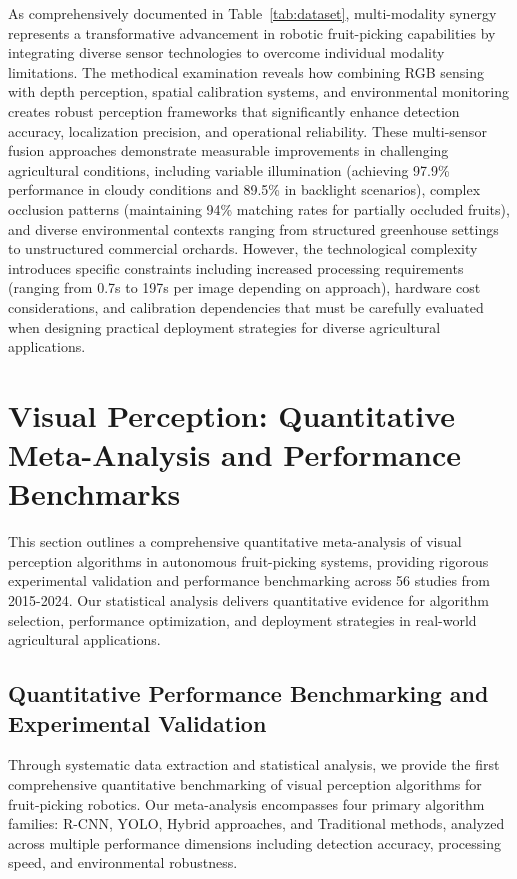 \documentclass{ieeeaccess}
\begin{document}
As comprehensively documented in Table~\ref{tab:dataset}, multi-modality synergy represents a transformative advancement in robotic fruit-picking capabilities by integrating diverse sensor technologies to overcome individual modality limitations. The methodical examination reveals how combining RGB sensing with depth perception, spatial calibration systems, and environmental monitoring creates robust perception frameworks that significantly enhance detection accuracy, localization precision, and operational reliability. These multi-sensor fusion approaches demonstrate measurable improvements in challenging agricultural conditions, including variable illumination (achieving 97.9\% performance in cloudy conditions and 89.5\% in backlight scenarios), complex occlusion patterns (maintaining 94\% matching rates for partially occluded fruits), and diverse environmental contexts ranging from structured greenhouse settings to unstructured commercial orchards. However, the technological complexity introduces specific constraints including increased processing requirements (ranging from 0.7s to 197s per image depending on approach), hardware cost considerations, and calibration dependencies that must be carefully evaluated when designing practical deployment strategies for diverse agricultural applications.

\section{Visual Perception: Quantitative Meta-Analysis and Performance Benchmarks}
This section outlines a comprehensive quantitative meta-analysis of visual perception algorithms in autonomous fruit-picking systems, providing rigorous experimental validation and performance benchmarking across 56 studies from 2015-2024. Our statistical analysis delivers quantitative evidence for algorithm selection, performance optimization, and deployment strategies in real-world agricultural applications.

\subsection{Quantitative Performance Benchmarking and Experimental Validation}
Through systematic data extraction and statistical analysis, we provide the first comprehensive quantitative benchmarking of visual perception algorithms for fruit-picking robotics. Our meta-analysis encompasses four primary algorithm families: R-CNN, YOLO, Hybrid approaches, and Traditional methods, analyzed across multiple performance dimensions including detection accuracy, processing speed, and environmental robustness.
\end{document}
